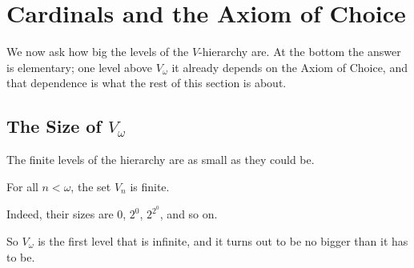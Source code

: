 \section{Cardinals and the Axiom of Choice}

We now ask how big the levels of the $V$-hierarchy are. At the bottom the answer is elementary; one level above $V_{\omega}$ it already depends on the Axiom of Choice, and that dependence is what the rest of this section is about.

\subsection{The Size of $V_{\omega}$}

The finite levels of the hierarchy are as small as they could be.

\begin{boxproposition}
    For all $n < \omega$, the set $V_{n}$ is finite.
\end{boxproposition}

Indeed, their sizes are $0$, $2^0$, $2^{2^{0}}$, and so on.

So $V_{\omega}$ is the first level that is infinite, and it turns out to be no bigger than it has to be.

